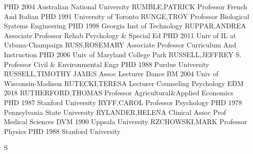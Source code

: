 \documentclass[
]{article}
\begin{document}
\textbar PHD 2004 Australian National University \textbar RUMBLE,PATRICK
\textbar Professor \textbar{}  \textbar French And Italian
\textbar PHD 1991 University of Toronto \textbar RUNGE,TROY
\textbar Professor \textbar{}  \textbar Biological Systems
Engineering \textbar PHD 1998 Georgia Inst of Technology
\textbar RUPPAR,ANDREA \textbar Associate Professor \textbar{}
 \textbar Rehab Psychology \& Special Ed \textbar PHD 2011
Univ of IL at Urbana-Champaign \textbar RUSS,ROSEMARY \textbar Associate
Professor \textbar{}  \textbar Curriculum And Instruction
\textbar PHD 2006 Univ of Maryland College Park \textbar RUSSELL,JEFFREY
S. \textbar Professor \textbar{}  \textbar Civil \&
Environmental Engr \textbar PHD 1988 Purdue University
\textbar RUSSELL,TIMOTHY JAMES \textbar Assoc Lecturer \textbar{}
 \textbar Dance \textbar BM 2004 Univ of Wisconsin-Madison
\textbar RUTECKI,TERESA \textbar Lecturer \textbar{} 
\textbar Counseling Psychology \textbar EDM 2018
\textbar RUTHERFORD,THOMAS \textbar Professor \textbar{} 
\textbar Agricultural\&Applied Economics \textbar PHD 1987 Stanford
University \textbar RYFF,CAROL \textbar Professor \textbar{}
 \textbar Psychology \textbar PHD 1978 Pennsylvania State
University \textbar RYLANDER,HELENA \textbar Clinical Assoc Prof
\textbar{}  \textbar Medical Sciences \textbar DVM 1990
Uppsala University \textbar RZCHOWSKI,MARK \textbar Professor \textbar{}
 \textbar Physics \textbar PHD 1988 Stanford University
\textbar{}

S

\textbar{}
\end{document}
